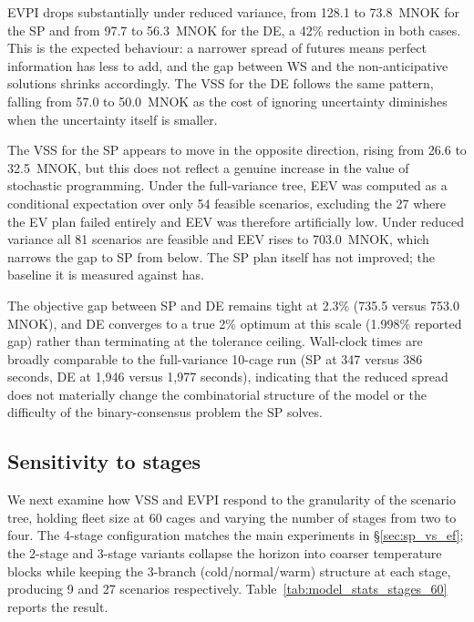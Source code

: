 \documentclass[12pt,a4paper]{article}
\begin{document}
EVPI drops substantially under reduced variance, from 128.1 to 73.8~MNOK
for the SP and from 97.7 to 56.3~MNOK for the DE, a 42\% reduction in
both cases. This is the expected behaviour: a narrower spread of futures
means perfect information has less to add, and the gap between WS and
the non-anticipative solutions shrinks accordingly. The VSS for the DE
follows the same pattern, falling from 57.0 to 50.0~MNOK as the cost of
ignoring uncertainty diminishes when the uncertainty itself is smaller.

The VSS for the SP appears to move in the opposite direction, rising from
26.6 to 32.5~MNOK, but this does not reflect a genuine increase in the
value of stochastic programming. Under the full-variance tree, EEV was
computed as a conditional expectation over only 54 feasible scenarios,
excluding the 27 where the EV plan failed entirely and EEV was therefore
artificially low. Under reduced variance all 81 scenarios are feasible
and EEV rises to 703.0~MNOK, which narrows the gap to SP from below.
The SP plan itself has not improved; the baseline it is measured against
has.

The objective gap between SP and DE remains tight at 2.3\% (735.5 versus
753.0 MNOK), and DE converges to a true 2\% optimum at this scale
(1.998\% reported gap) rather than terminating at the tolerance ceiling.
Wall-clock times are broadly comparable to the full-variance 10-cage run
(SP at 347 versus 386 seconds, DE at 1{,}946 versus 1{,}977 seconds),
indicating that the reduced spread does not materially change the
combinatorial structure of the model or the difficulty of the
binary-consensus problem the SP solves.


\subsection{Sensitivity to stages}
\label{sec:stages}

We next examine how VSS and EVPI respond to the granularity of the
scenario tree, holding fleet size at 60 cages and varying the number of
stages from two to four. The 4-stage configuration matches the main
experiments in §\ref{sec:sp_vs_ef}; the 2-stage and 3-stage variants
collapse the horizon into coarser temperature blocks while keeping the
3-branch (cold/normal/warm) structure at each stage, producing 9 and 27
scenarios respectively. Table~\ref{tab:model_stats_stages_60} reports
the result.
\end{document}
